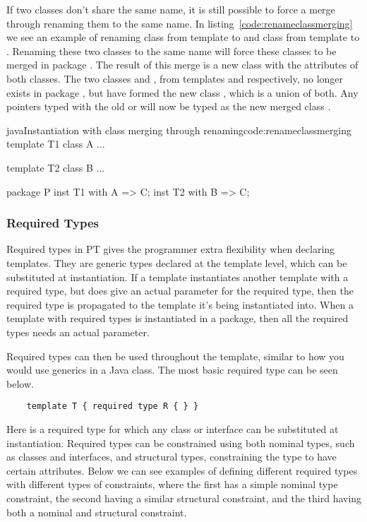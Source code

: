 If two classes don't share the same name, it is still possible to force a merge through renaming them to the same name.
In listing~\vref{code:renameclassmerging} we see an example of renaming class  from template  to  and class  from template  to .
Renaming these two classes to the same name will force these classes to be merged in package .
The result of this merge is a new class  with the attributes of both classes.
The two classes  and , from templates  and  respectively, no longer exists in package , but have formed the new class , which is a union of both.
Any pointers typed with the old  or  will now be typed as the new merged class .

\begin{code}{java}{Instantiation with class merging through renaming}{code:renameclassmerging}
template T1 {
    class A {
        ...
    }
}

template T2 {
    class B {
        ...
    }
}

package P {
    inst T1 with A => C;
    inst T2 with B => C;
}
\end{code}

\subsubsection{Required Types}\label{subsubsec:required-types}

Required types in PT gives the programmer extra flexibility when declaring templates.
They are generic types declared at the template level, which can be substituted at instantiation.
If a template instantiates another template with a required type, but does give an actual parameter for the required type, then the required type is propagated to the template it's being instantiated into.
When a template with required types is instantiated in a package, then all the required types needs an actual parameter.

Required types can then be used throughout the template, similar to how you would use generics in a Java class.
The most basic required type can be seen below.

\begin{verbatim}
    template T { required type R { } }
\end{verbatim}

Here  is a required type for which any class or interface can be substituted at instantiation.
Required types can be constrained using both nominal types, such as classes and interfaces, and structural types, constraining the type to have certain attributes.
Below we can see examples of defining different required types with different types of constraints, where the first has a simple nominal type constraint, the second having a similar structural constraint, and the third having both a nominal and structural constraint.

